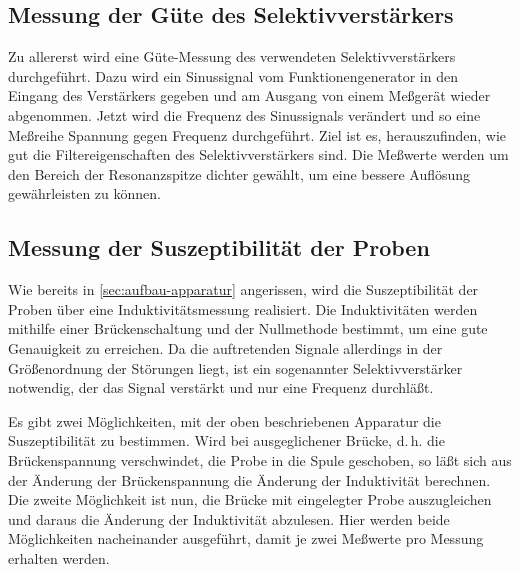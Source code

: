 \subsection{Messung der Güte des Selektivverstärkers}

Zu allererst wird eine Güte-Messung des verwendeten Selektivverstärkers
durchgeführt.  Dazu wird ein Sinussignal vom Funktionengenerator in den
Eingang des Verstärkers gegeben und am Ausgang von einem Meßgerät wieder
abgenommen.  Jetzt wird die Frequenz des Sinussignals verändert und so
eine Meßreihe Spannung gegen Frequenz durchgeführt.  Ziel ist es,
herauszufinden, wie gut die Filtereigenschaften des Selektivverstärkers
sind.  Die Meßwerte werden um den Bereich der Resonanzspitze dichter
gewählt, um eine bessere Auflösung gewährleisten zu können.

\subsection{Messung der Suszeptibilität der Proben}

Wie bereits in \cref{sec:aufbau-apparatur} angerissen, wird die
Suszeptibilität der Proben über eine Induktivitätsmessung realisiert.
Die Induktivitäten werden mithilfe einer Brückenschaltung und der
Nullmethode bestimmt, um eine gute Genauigkeit zu erreichen.  Da die
auftretenden Signale allerdings in der Größenordnung der Störungen
liegt, ist ein sogenannter Selektivverstärker notwendig, der das Signal
verstärkt und nur eine Frequenz durchläßt.

Es gibt zwei Möglichkeiten, mit der oben beschriebenen Apparatur die
Suszeptibilität zu bestimmen.  Wird bei ausgeglichener Brücke,
d.\,h. die Brückenspannung verschwindet, die Probe in die Spule
geschoben, so läßt sich aus der Änderung der Brückenspannung die
Änderung der Induktivität berechnen.  Die zweite Möglichkeit ist nun,
die Brücke mit eingelegter Probe auszugleichen und daraus die Änderung
der Induktivität abzulesen.  Hier werden beide Möglichkeiten
nacheinander ausgeführt, damit je zwei Meßwerte pro Messung erhalten
werden.
